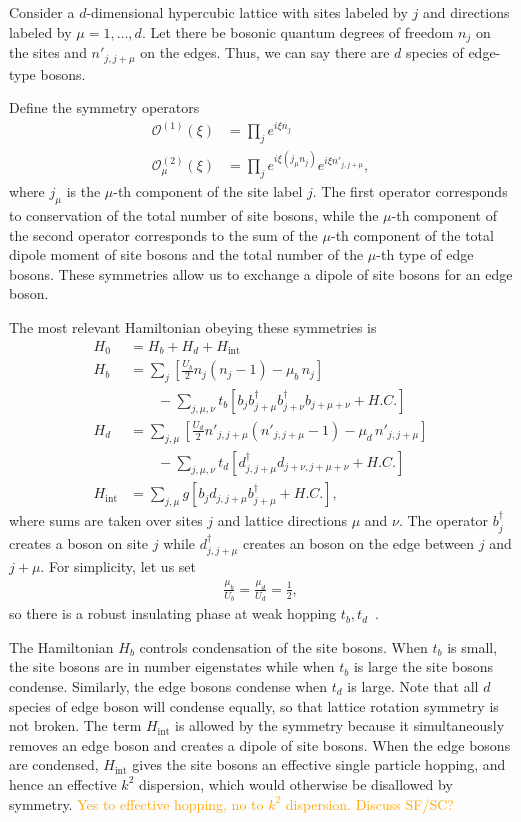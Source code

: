 \documentclass[pra,aps,twocolumn, amsfonts,amsmath,amssymb,nofootinbib,superscriptaddress]{revtex4}
\newcommand{\todo}[1]{\textcolor{orange}{#1}}
\newcommand{\op}[1]{\mathcal{O}^{(#1)}}
\newcommand{\nn}{\nonumber\\}
\begin{document}
Consider a $d$-dimensional hypercubic lattice with sites labeled by $j$ and directions labeled by $\mu = 1,\dots,d$. Let there be bosonic quantum degrees of freedom $n_j$ on the sites and $n'_{j,j+\mu}$ on the edges. Thus, we can say there are $d$ species of edge-type bosons.

Define the symmetry operators
\begin{align}
\op{1}(\xi) &= \prod_je^{i\xi n_j}\nn
\op{2}_\mu(\xi) &= \prod_j e^{i\xi (j_\mu n_j)}e^{i\xi n'_{j,j+\mu}},
\end{align}
where $j_\mu$ is the $\mu$-th component of the site label $j$.
The first operator corresponds to conservation of the total number of site bosons, while the $\mu$-th component of the second operator corresponds to the sum of the $\mu$-th component of the total dipole moment of site bosons and the total number of the $\mu$-th type of edge bosons. These symmetries allow us to exchange a dipole of site bosons for an edge boson. 

The most relevant Hamiltonian obeying these symmetries is  
\begin{align}
H_0  &= H_b + H_d + H_\text{int}\nn
H_b &= \sum_j \left[ \frac{U_b}{2}  n_j (n_j-1) - \mu_b \, n_j \right] \nn
&\qquad - \sum_{j,\mu,\nu} t_b \left[  b_j b^{\dag}_{j+\mu} b^{\dag}_{j+\nu} b_{j+\mu+\nu} + H.C. \right]\nn
H_d &= \sum_{j,\mu} \left[ \frac{U_d}{2} n'_{j,j+\mu} (n'_{j,j+\mu} - 1) -\mu_d \, n'_{j, j + \mu} \right]\nn
&\qquad  - \sum_{j,\mu,\nu} t_d \left[d^{\dag}_{j, j + \mu} d_{j + \nu, j+\mu + \nu} +H.C.\right]\nn
H_\text{int} &= \sum_{j,\mu} g\left[ b_j d_{j,j+\mu} b^\dag_{j+\mu} + H.C. \right],
\end{align}
where sums are taken over sites $j$ and lattice directions $\mu$ and $\nu$.  The operator $b^\dagger_j$ creates a boson on site $j$ while $d^\dagger_{j,j+\mu}$ creates an boson on the edge between $j$ and $j+\mu$. For simplicity, let us set 
\begin{align}
\frac{\mu_b}{ U_b} = \frac{\mu_d }{ U_d} = \frac{1}{2},
\end{align}
so there is a robust insulating phase at weak hopping $t_b, t_d$~\cite{Fisheretal}. 

The Hamiltonian $H_b$ controls condensation of the site bosons. When $t_b$ is small, the site bosons are in number eigenstates while when $t_b$ is large the site bosons condense. Similarly, the edge bosons condense when $t_d$ is large. Note that all $d$ species of edge boson will condense equally, so that lattice rotation symmetry is not broken. The term $H_\text{int}$ is allowed by the symmetry because it simultaneously removes an edge boson and creates a dipole of site bosons. When the edge bosons are condensed, $H_\text{int}$ gives the site bosons an effective single particle hopping, and hence an effective $k^2$ dispersion, which would otherwise be disallowed by symmetry. \todo{Yes to effective hopping, no to $k^2$ dispersion. Discuss SF/SC?}
\end{document}
